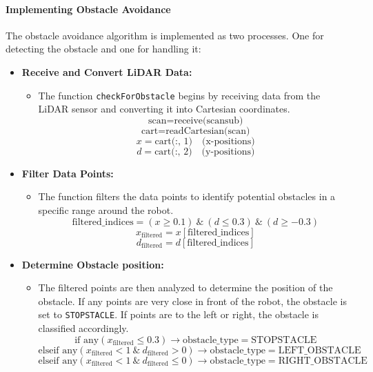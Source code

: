 \documentclass{article}
\begin{document}
	\paragraph{Implementing Obstacle Avoidance}
	The obstacle avoidance algorithm is implemented as two processes. One for detecting the obstacle and one for handling it:	
	\begin{itemize}
		\item \textbf{Receive and Convert LiDAR Data:}
		\begin{itemize}
			\item The function \texttt{checkForObstacle} begins by receiving data from the LiDAR sensor and converting it into Cartesian coordinates.
			\[
			\text{scan} = \text{receive(scansub)}
			\]
			\[
			\text{cart} = \text{readCartesian(scan)}
			\]
			\[
			x = \text{cart(:, 1)} \quad \text{(x-positions)}
			\]
			\[
			d = \text{cart(:, 2)} \quad \text{(y-positions)}
			\]
		\end{itemize}
		
		\item \textbf{Filter Data Points:}
		\begin{itemize}
			\item The function filters the data points to identify potential obstacles in a specific range around the robot.
			\[
			\text{filtered\_indices} = (x \geq 0.1) \ \&\ (d \leq 0.3) \ \&\ (d \geq -0.3)
			\]
			\[
			x_{\text{filtered}} = x[\text{filtered\_indices}]
			\]
			\[
			d_{\text{filtered}} = d[\text{filtered\_indices}]
			\]
		\end{itemize}
		
		\item \textbf{Determine Obstacle position:}
		\begin{itemize}
			\item The filtered points are then analyzed to determine the position of the obstacle. If any points are very close in front of the robot, the obstacle is set to \texttt{STOPSTACLE}. If points are to the left or right, the obstacle is classified accordingly.
			\[
			\text{if any}(x_{\text{filtered}} \leq 0.3) \rightarrow \text{obstacle\_type} = \text{STOPSTACLE}
			\]
			\[
			\text{elseif any}(x_{\text{filtered}} < 1 \ \&\ d_{\text{filtered}} > 0) \rightarrow \text{obstacle\_type} = \text{LEFT\_OBSTACLE}
			\]
			\[
			\text{elseif any}(x_{\text{filtered}} < 1 \ \&\ d_{\text{filtered}} \leq 0) \rightarrow \text{obstacle\_type} = \text{RIGHT\_OBSTACLE}
			\]
		\end{itemize}
		

\end{itemize}
\end{document}
